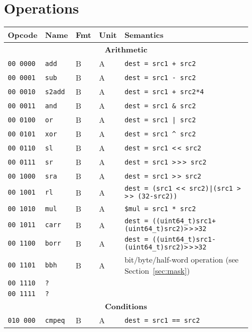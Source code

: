 \documentclass[10pt,DIV12]{scrartcl}
\newcommand{\shl}{\textless$\,\!$\textless}
\newcommand{\shr}{\textgreater$\,\!$\textgreater$\,\!$\textgreater}
\newcommand{\ashr}{\textgreater$\,\!$\textgreater}
\begin{document}
\pagebreak

\section{Operations}

\begin{longtable}{llllp{}}
\toprule
Opcode & Name & Fmt & Unit & Semantics \\
\midrule
\multicolumn{5}{c}{\textsf{\textbf{Arithmetic}}} \\
\cmidrule{1-5}
\texttt{00 0000} & \texttt{add} & B & A & \texttt{dest = src1 + src2} \\
\texttt{00 0001} & \texttt{sub} & B & A & \texttt{dest = src1 - src2} \\
\texttt{00 0010} & \texttt{s2add} & B & A & \texttt{dest = src1 + src2*4} \\
\texttt{00 0011} & \texttt{and} & B & A & \texttt{dest = src1 \& src2} \\
\texttt{00 0100} & \texttt{or} & B & A & \texttt{dest = src1 | src2} \\
\texttt{00 0101} & \texttt{xor} & B & A & \texttt{dest = src1 \textasciicircum{} src2} \\
\texttt{00 0110} & \texttt{sl} & B & A & \texttt{dest = src1 \shl{} src2} \\
\texttt{00 0111} & \texttt{sr} & B & A & \texttt{dest = src1 \shr{} src2} \\
\texttt{00 1000} & \texttt{sra} & B & A & \texttt{dest = src1 \ashr{} src2} \\
\texttt{00 1001} & \texttt{rl} & B & A & \texttt{dest = (src1 \shl{} src2)|(src1 \shr{} (32-src2))} \\
\texttt{00 1010} & \texttt{mul} & B & A & \texttt{\$mul = src1 * src2} \\
\texttt{00 1011} & \texttt{carr} & B & A & \texttt{dest = ((uint64\_t)src1+(uint64\_t)src2)\shr{}32} \\
\texttt{00 1100} & \texttt{borr} & B & A & \texttt{dest = ((uint64\_t)src1-(uint64\_t)src2)\shr{}32} \\
\texttt{00 1101} & \texttt{bbh} & B & A & bit/byte/half-word operation (see Section~\ref{sec:mask}) \\
\texttt{00 1110} & \texttt{?} & & & \\
\texttt{00 1111} & \texttt{?} & & & \\
\midrule
\multicolumn{5}{c}{\textsf{\textbf{Conditions}}} \\
\cmidrule{1-5}
\texttt{010 000} & \texttt{cmpeq} & B & A & \texttt{dest = src1 == src2} \\

\end{longtable}
\end{document}

